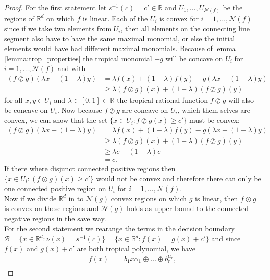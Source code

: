 \documentclass{article}
\theoremstyle{definition}
\begin{document}
\begin{proof}
For the first statement let $s^{-1}(c)=c' \in \mathbb{R}$ and $U_1 , \dots , U_{\mathcal{N}(f)}$ be the regions of $\mathbb{R}^{d}$ on which $f$ is linear. Each of the $U_i$ is convex for $i=1 , \dots , \mathcal{N}(f)$ since if we take two elements from $U_i$, then all elements on the connecting line segment also have to have the same maximal monomial, or else the initial elements would have had different maximal monomials. Because of lemma \ref{lemma:trop_properties} the tropical monomial $-g$ will be concave on $U_i$ for $i = 1, \dots , \mathcal{N}(f)$ and with
\begin{align*}
(f \oslash g) (\lambda x + (1-\lambda)y)
&= \lambda f(x) + (1-\lambda) f(y) - g(\lambda x + (1-\lambda)y) \\
&\geq \lambda (f \oslash g)(x) + (1-\lambda) (f \oslash g) (y)
\end{align*}
for all $x, y \in U_i$ and $\lambda \in [0,1] \subset \mathbb{R}$ the tropical rational function $f \oslash g$ will also be concave on $U_i$. Now because $f \oslash g$ are concave on $U_i$, which them selves are convex, we can show that the set $\{x \in U_i : f \oslash g(x) \geq c'\}$ must be convex:
\begin{align*}
(f \oslash g) (\lambda x + (1-\lambda)y)
&= \lambda f(x) + (1-\lambda) f(y) - g(\lambda x + (1-\lambda)y) \\
&\geq \lambda (f \oslash g)(x) + (1-\lambda) (f \oslash g) (y) \\
&\geq \lambda c + (1-\lambda)c \\
&= c.
\end{align*}
If there where disjunct connected positive regions then $\{ x \in U_i : (f \oslash g)(x) \geq c' \}$ would not be convex and therefore there can only be one connected positive region on $U_i$ for $i = 1, \dots , \mathcal{N}(f)$. \\
Now if we divide $\mathbb{R}^{d}$ in to $\mathcal{N}(g)$ convex regions on which $g$ is linear, then $f \oslash g$ is convex on these regions and $\mathcal{N}(g)$ holds as upper bound to the connected negative regions in the save way. \\
For the second statement we rearange the terms in the decision boundary $\mathcal{B} = \{ x \in \mathbb{R}^{d} : \nu(x) = s^{-1}(c) \} = \{ x \in \mathbb{R}^{d} : f(x) = g(x) + c' \}$ and since $f(x)$ and $g(x) + c'$ are both tropical polynomial, we have
\begin{align*}
f(x) &= b_1 x{\alpha_1} \oplus \dots \oplus b_r^{\alpha_r}, \\

\end{align*}
\end{proof}
\end{document}
